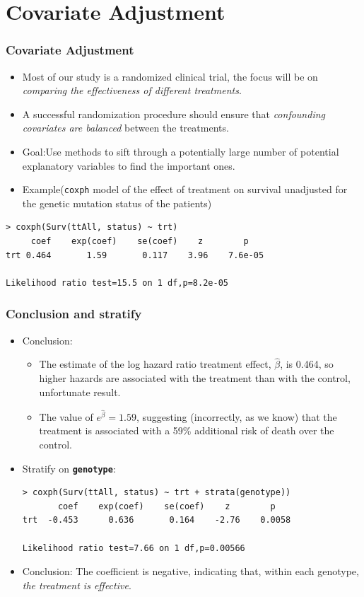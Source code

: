 \documentclass{beamer}
\newcommand{\empr}[1]{{\emph{\color{red}#1}}}
\newcommand{\pkg}[1]{{\textbf{\texttt{#1}}}}
\begin{document}
\section{Covariate Adjustment}
\begin{frame}[fragile]
\frametitle{Covariate Adjustment}
\begin{itemize}
\item Most of our study is a randomized clinical trial, the focus will be on \empr{comparing the effectiveness of different treatments}.
\item A successful randomization procedure should ensure that \empr{confounding covariates are balanced} between the treatments.
\item {\color{red}Goal}:Use methods to {\color{red}sift through} a potentially large number of potential explanatory variables to find the important ones.
\item Example(\texttt{coxph} model of the effect of treatment on survival unadjusted for the genetic mutation status of the patients)
\end{itemize}
\begin{Verbatim}
> coxph(Surv(ttAll, status) ~ trt)
     coef    exp(coef)    se(coef)    z        p 
trt 0.464       1.59       0.117    3.96    7.6e-05

Likelihood ratio test=15.5 on 1 df,p=8.2e-05 
\end{Verbatim}
\end{frame}

\pagebreak
\begin{frame}[fragile]
\frametitle{Conclusion and stratify}
\begin{itemize}
\item Conclusion:
\begin{itemize} 
\item The estimate of the log hazard ratio treatment effect, $\hat{\beta}$, is 0.464, so higher hazards are associated with the treatment than with the control, unfortunate result.
\item The value of $e^{\hat{\beta}}=1.59$, suggesting (incorrectly, as we know) that the treatment is associated with a 59\% additional risk of death over the control.
\end{itemize}
\item Stratify on \pkg{genotype}:
\begin{Verbatim}
> coxph(Surv(ttAll, status) ~ trt + strata(genotype))
       coef    exp(coef)    se(coef)    z        p 
trt  -0.453      0.636       0.164    -2.76    0.0058

Likelihood ratio test=7.66 on 1 df,p=0.00566 
\end{Verbatim}
\item Conclusion: The coefficient is negative, indicating that, within each genotype, \empr{the treatment is effective}.
\end{itemize}
\end{frame}
\end{document}
